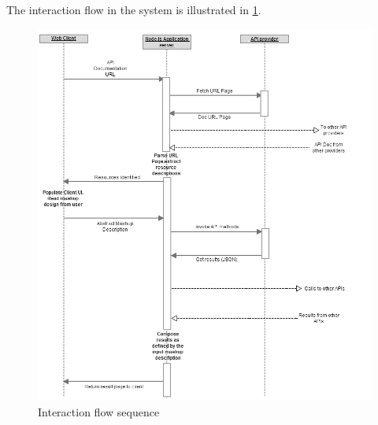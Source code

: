 \documentclass[journal]{IEEEtran}
\begin{document}
The interaction flow in the system is illustrated in \ref{fig:interaction_flow}.
\begin{figure}[!t]
   \centering
    \includegraphics[width=6in] {images/seq.png}
    \caption{Interaction flow sequence}
    \label{fig:interaction_flow}
\end{figure}
\end{document}
